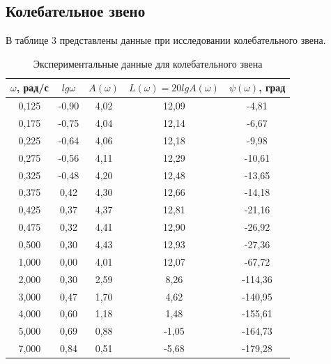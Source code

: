\documentclass[a4paper,12pt]{article} %
\begin{document}
\newpage
\begin{center}
\section{Колебательное звено}
\end{center}

В таблице 3 представлены данные при исследовании колебательного звена.
\begin{table}[h!]
	\renewcommand{\arraystretch}{1.8} %
	\centering
	\begin{threeparttable}
	\caption{Экспериментальные данные для колебательного звена}
	\begin{tabular}{|c|c|c|c|c|}
		\hline $\omega$, рад/с & $lg\omega$ & $A(\omega)$ & $L(\omega)=20lgA(\omega)$ & $\psi(\omega)$, град\\
		\hline 0,125 & -0,90 & 4,02 & 12,09 & -4,81\\
		\hline 0,175 & -0,75 & 4,04 & 12,14 & -6,67\\
		\hline 0,225 & -0,64 & 4,06 & 12,18 & -9,98\\
		\hline 0,275 & -0,56 & 4,11 & 12,29 & -10,61\\
		\hline 0,325 & -0,48 & 4,20 & 12,48 & -13,65\\
		\hline 0,375 & 0,42 & 4,30 & 12,66 & -14,18\\
		\hline 0,425 & 0,37 & 4,37 & 12,81 & -21,16\\
		\hline 0,475 & 0,32 & 4,41 & 12,90 & -26,92\\
		\hline 0,500 & 0,30 & 4,43 & 12,93 & -27,36\\
		\hline 1,000 & 0,00 & 4,01 & 12,07 & -67,72\\
		\hline 2,000 & 0,30 & 2,59 & 8,26 & -114,36\\
		\hline 3,000 & 0,47 & 1,70 & 4,62 & -140,95\\
		\hline 4,000 & 0,60 & 1,18 & 1,48 & -155,61\\
		\hline 5,000 & 0,69 & 0,88 & -1,05 & -164,73\\
		\hline 7,000 & 0,84 & 0,51 & -5,68 & -179,28\\				
		\hline
	\end{tabular}
	\end{threeparttable}
\end{table}
\end{document}
